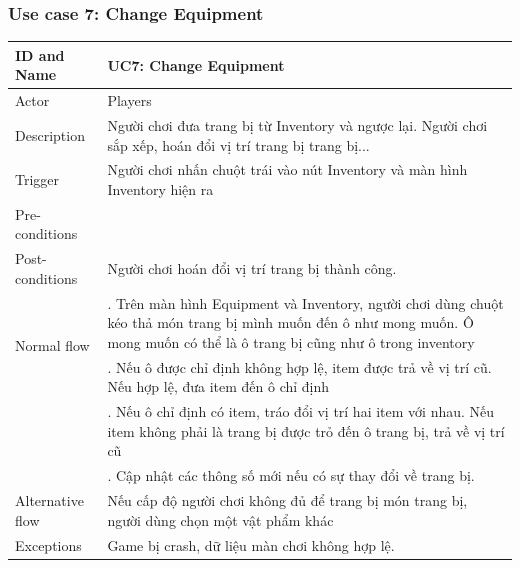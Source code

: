 \subsubsection{Use case 7: Change Equipment}
\begin{center}
	\begin{tabular}{|l|p{12cm}|}
		\hline
		ID and Name & UC7: Change Equipment \\
		\hline
		Actor  & Players \\
		\hline
		Description  & Người chơi đưa trang bị từ Inventory và ngược lại. Người chơi sắp xếp, hoán đổi vị trí trang bị trang bị...\\
		\hline
		Trigger  & Người chơi nhấn chuột trái vào nút Inventory và màn hình Inventory hiện ra\\
		\hline
		Pre-conditions &\\
		\hline
		Post-conditions  & Người chơi hoán đổi vị trí trang bị thành công.\\
		\hline
		\multirow{2}{*}{Normal flow}      &\qquad 1. Trên màn hình Equipment và Inventory, người chơi dùng chuột kéo thả món trang bị mình muốn đến ô như mong muốn. Ô mong muốn có thể là ô trang bị cũng như ô trong inventory\\
		&\qquad 2. Nếu ô được chỉ định không hợp lệ, item được trả về vị trí cũ. Nếu hợp lệ, đưa item đến ô chỉ định\\
		&\qquad 3. Nếu ô chỉ định có item, tráo đổi vị trí hai item với nhau. Nếu item không phải là trang bị được trỏ đến ô trang bị, trả về vị trí cũ\\
		&\qquad 4. Cập nhật các thông số mới nếu có sự thay đổi về trang bị.\\
		\hline
		Alternative flow  & Nếu cấp độ người chơi không đủ để trang bị món trang bị, người dùng chọn một vật phẩm khác\\
		\hline
		Exceptions  & Game bị crash, dữ liệu màn chơi không hợp lệ.\\
		\hline
	\end{tabular}
\end{center}
